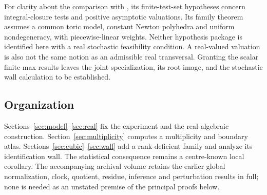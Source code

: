 For clarity about the comparison with \cite{Ha26}, its finite-test-set
hypotheses concern integral-closure tests and positive asymptotic
valuations. Its family theorem assumes a common toric model, constant
Newton polyhedra and uniform nondegeneracy, with piecewise-linear weights.
Neither hypothesis package is identified here with a real stochastic
feasibility condition. A real-valued valuation is also not the same
notion as an admissible real transversal. Granting the scalar finite-max
results leaves the joint specialization, its root image, and the
stochastic wall calculation to be established.

\subsection*{Organization}
Sections~\ref{sec:model}--\ref{sec:real} fix the experiment and the
real-algebraic construction. Section~\ref{sec:multiplicity} computes a
multiplicity and boundary atlas. Sections~\ref{sec:cubic}--\ref{sec:wall}
add a rank-deficient family and analyze its identification wall. The
statistical consequence remains a centre-known local corollary.
The accompanying archival volume retains the earlier global normalization,
clock, quotient, residue, inference and perturbation results in full;
none is needed as an unstated premise of the principal proofs below.








